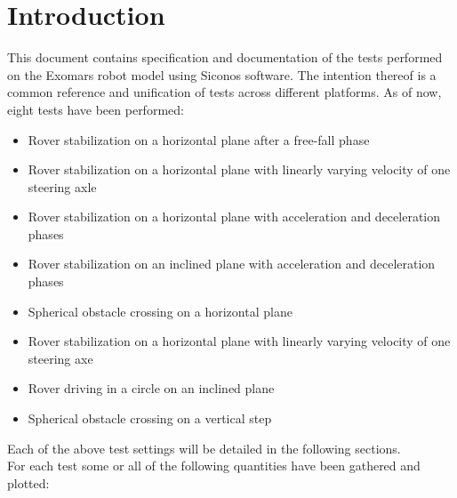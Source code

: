 \documentclass[a4paper]{article}
\begin{document}


\section{Introduction}

This document contains specification and documentation of the tests performed 
on the Exomars robot model using Siconos software. The intention thereof is a common reference and unification
of tests across different platforms. As of now, eight tests have been performed:

\begin{itemize}
  \item Rover stabilization on a horizontal plane after a free-fall phase
  \item Rover stabilization on a horizontal plane with linearly varying velocity of one steering axle
  \item Rover stabilization on a horizontal plane with acceleration and deceleration phases
  \item Rover stabilization on an inclined plane with acceleration and deceleration phases 
  \item Spherical obstacle crossing on a horizontal plane 
  \item Rover stabilization on a horizontal plane with linearly varying velocity of one steering axe
  \item Rover driving in a circle on an inclined plane
  \item Spherical obstacle crossing on a vertical step 

\end{itemize}

\noindent Each of the above test settings will be detailed in the following sections. \\

\noindent For each test some or all of the following quantities have been gathered and plotted:
\end{document}
